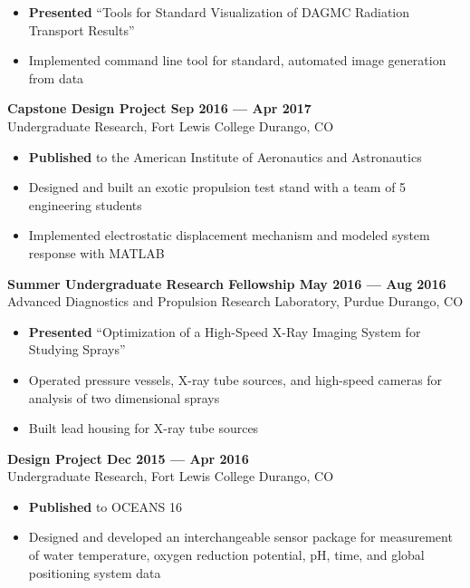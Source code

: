 \begin{itemize}
    \item \textbf{Presented} ``Tools for Standard Visualization of DAGMC Radiation Transport Results''
    \item Implemented command line tool for standard, automated image generation from data
\end{itemize}

\textbf{Capstone Design Project \hfill Sep 2016 --- Apr 2017}\\
Undergraduate Research, Fort Lewis College \hfill Durango, CO

\begin{itemize}
    \item \textbf{Published} to the American Institute of Aeronautics and Astronautics
    \item Designed and built an exotic propulsion test stand with a team of 5 engineering students
    \item Implemented electrostatic displacement mechanism and modeled system response with MATLAB
\end{itemize}

\textbf{Summer Undergraduate Research Fellowship \hfill May 2016 --- Aug 2016}\\
Advanced Diagnostics and Propulsion Research Laboratory, Purdue \hfill Durango, CO

\begin{itemize}
    \item \textbf{Presented} ``Optimization of a High-Speed X-Ray Imaging System for Studying Sprays''
    \item Operated pressure vessels, X-ray tube sources, and high-speed cameras for analysis of two dimensional sprays
    \item Built lead housing for X-ray tube sources
\end{itemize}

\textbf{Design Project \hfill Dec 2015 --- Apr 2016}\\
Undergraduate Research, Fort Lewis College \hfill Durango, CO

\begin{itemize}
    \item \textbf{Published} to OCEANS 16
    \item Designed and developed an interchangeable sensor package for measurement of water temperature, oxygen reduction potential, pH, time, and global positioning system data
\end{itemize}
